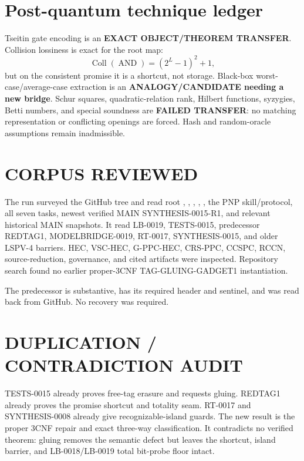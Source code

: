 \documentclass[11pt]{article}
\begin{document}
\section{Post-quantum technique ledger}

Tseitin gate encoding is an \textbf{EXACT OBJECT/THEOREM TRANSFER}.  Collision
lossiness is exact for the root map:
\[
\operatorname{Coll}(\operatorname{AND})=(2^L-1)^2+1,
\]
but on the consistent promise it is a shortcut, not storage.  Black-box
worst-case/average-case extraction is an \textbf{ANALOGY/CANDIDATE needing a
new bridge}.  Schur squares, quadratic-relation rank, Hilbert functions,
syzygies, Betti numbers, and special soundness are \textbf{FAILED TRANSFER}:
no matching representation or conflicting openings are forced.  Hash and
random-oracle assumptions remain inadmissible.

\section{CORPUS REVIEWED}

The run surveyed the GitHub tree and read root ,
, , , , the
PNP skill/protocol, all seven tasks, newest verified MAIN SYNTHESIS-0015-R1,
and relevant historical MAIN snapshots.  It read LB-0019, TESTS-0015,
predecessor REDTAG1, MODELBRIDGE-0019, RT-0017, SYNTHESIS-0015, and older
LSPV-4 barriers.  HEC, VSC-HEC, G-PPC-HEC, CRS-PPC, CCSPC, RCCN,
source-reduction, governance, and cited artifacts were inspected.  Repository
search found no earlier proper-3CNF TAG-GLUING-GADGET1 instantiation.

The predecessor
is substantive, has its required header and sentinel, and was read back from
GitHub.  No recovery was required.

\section{DUPLICATION / CONTRADICTION AUDIT}

TESTS-0015 already proves free-tag erasure and requests gluing.  REDTAG1
already proves the promise shortcut and totality seam.  RT-0017 and
SYNTHESIS-0008 already give recognizable-island guards.  The new result is
the proper 3CNF repair and exact three-way classification.  It contradicts no
verified theorem: gluing removes the semantic defect but leaves the shortcut,
island barrier, and LB-0018/LB-0019 total bit-probe floor intact.
\end{document}
